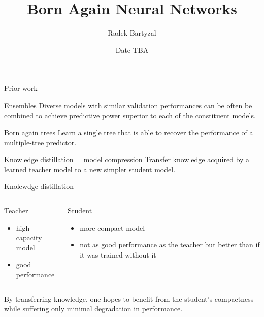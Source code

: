 \documentclass{beamer}
\begin{document}
\title{Born Again Neural Networks}  
\author{Radek Bartyzal}
\date{Date TBA} 

\frame{\titlepage} 

\begin{frame}{Prior work}


\begin{block}{Ensembles}
Diverse models with similar validation performances can be often be combined to achieve predictive
power superior to each of the constituent models. \cite{cit:ensembles}
\end{block}

\begin{block}{Born again trees}
Learn a single tree that is able to recover the performance of a multiple-tree predictor. \cite{cit:bat}
\end{block}

\begin{block}{Knowledge distillation = model compression}
Transfer knowledge acquired by a learned
teacher model to a new simpler student model. \cite{cit:distill}
\end{block}



\end{frame}

\begin{frame}[t]{Knolewdge distillation}

\begin{columns}[t]
\begin{column}{0.5\textwidth}
Teacher
\begin{itemize}
\item high-capacity model
\item good performance
\end{itemize}
\end{column}

\begin{column}{0.5\textwidth}
Student
\begin{itemize}
\item more compact model
\item not as good performance as the teacher but better than if it was trained without it
\end{itemize}
\end{column}

\end{columns}

\vfill
By transferring knowledge, one hopes to benefit from the student’s
compactness while suffering only minimal degradation in performance.

\end{frame}
\end{document}

